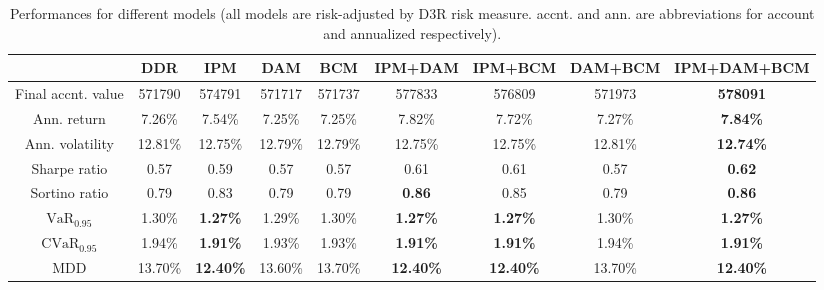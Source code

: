 \documentclass{article}
\begin{document}
\begin{table}[ht]
\caption{Performances for different models (all models are risk-adjusted by D3R risk measure. accnt. and ann. are abbreviations for account and annualized respectively).}
\label{performance_ddr}
\begin{center}
\begin{small}
\begin{tabular}{|c|c|c|c|c|c|c|c|c|}
\hline
                      & DDR     & IPM              & DAM     & BCM     & IPM+DAM          & IPM+BCM          & DAM+BCM & IPM+DAM+BCM      \\ \hline
Final accnt. value   & 571790  & 574791           & 571717  & 571737  & 577833           & 576809           & 571973  & \textbf{578091}  \\ \hline
Ann. return     & 7.26\%  & 7.54\%           & 7.25\%  & 7.25\%  & 7.82\%           & 7.72\%           & 7.27\%  & \textbf{7.84\%}  \\ \hline
Ann. volatility & 12.81\% & 12.75\%          & 12.79\% & 12.79\% & 12.75\%          & 12.75\%          & 12.81\% & \textbf{12.74\%} \\ \hline
Sharpe ratio          & 0.57    & 0.59             & 0.57    & 0.57    & 0.61             & 0.61             & 0.57    & \textbf{0.62}    \\ \hline
Sortino ratio         & 0.79    & 0.83             & 0.79    & 0.79    & \textbf{0.86}    & 0.85             & 0.79    & \textbf{0.86}    \\ \hline
$\text{VaR}_{0.95}$                   & 1.30\%  & \textbf{1.27\%}  & 1.29\%  & 1.30\%  & \textbf{1.27\%}  & \textbf{1.27\%}  & 1.30\%  & \textbf{1.27\%}  \\ \hline
$\text{CVaR}_{0.95}$                  & 1.94\%  & \textbf{1.91\%}  & 1.93\%  & 1.93\%  & \textbf{1.91\%}  & \textbf{1.91\%}  & 1.94\%  & \textbf{1.91\%}  \\ \hline
MDD                   & 13.70\% & \textbf{12.40\%} & 13.60\% & 13.70\% & \textbf{12.40\%} & \textbf{12.40\%} & 13.70\% & \textbf{12.40\%} \\ \hline
\end{tabular}
\end{small}
\end{center}
\end{table}

\end{document}
